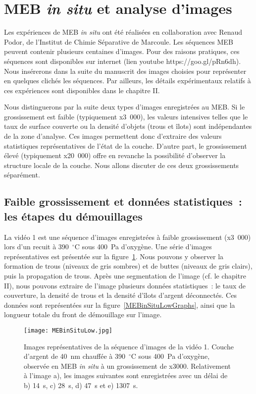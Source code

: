 \section{MEB \textit{in situ} et analyse d'images}
Les expériences de MEB \textit{in situ} ont été réalisées en collaboration avec Renaud Podor, de l'Institut de Chimie Séparative de Marcoule. Les séquences MEB peuvent contenir plusieurs centaines d'images. Pour des raisons pratiques, ces séquences sont disponibles sur internet (lien youtube https://goo.gl/pRn6dh). Nous insérerons dans la suite du manuscrit des images choisies pour représenter en quelques clichés les séquences. Par ailleurs, les détails expérimentaux relatifs à ces expériences sont disponibles dans le chapitre II. \par
Nous distinguerons par la suite deux types d'images enregistrées au MEB. Si le grossissement est faible (typiquement x3~000), les valeurs intensives telles que le taux de surface couverte ou la densité d'objets (trous et îlots) sont indépendantes de la zone d'analyse. Ces images permettent donc d'extraire des valeurs statistiques représentatives de l'état de la couche. D'autre part, le grossissement élevé (typiquement x20~000) offre en revanche la possibilité d'observer la structure locale de la couche. Nous allons discuter de ces deux grossissements séparément.

\subsection{Faible grossissement et données statistiques~: les étapes du démouillages}
\label{sLowMag}
La vidéo 1 est une séquence d'images enregistrées à faible grossissement (x3~000) lors d'un recuit à 390~$^\circ$C sous 400~Pa d'oxygène. Une série d'images représentatives est présentée sur la figure~\ref{MEBinSituLow}. Nous pouvons y observer la formation de trous (niveaux de gris sombres) et de buttes (niveaux de gris clairs), puis la propagation de trous. Après une segmentation de l'image (cf. le chapitre II), nous pouvons extraire de l'image plusieurs données statistiques~: le taux de couverture, la densité de trous et la densité d'îlots d'argent déconnectés. Ces données sont représentées sur la figure~\ref{MEBinSituLowGraphs}, ainsi que la longueur totale du front de démouillage sur l'image.\par

\begin{figure}[!htb]
	\centering
	\texttt{[image: MEBinSituLow.jpg]}
	\caption{Images représentatives de la séquence d'images de la vidéo 1. Couche d'argent de 40~nm chauffée à 390~$^\circ$C sous 400~Pa d'oxygène, observée en MEB \textit{in situ} à un grossissement de x3000. Relativement à l'image a), les images suivantes sont enregistrées avec un délai de b) 14~s, c) 28~s, d) 47~s et e) 1307~s.}
	\label{MEBinSituLow}
\end{figure}

